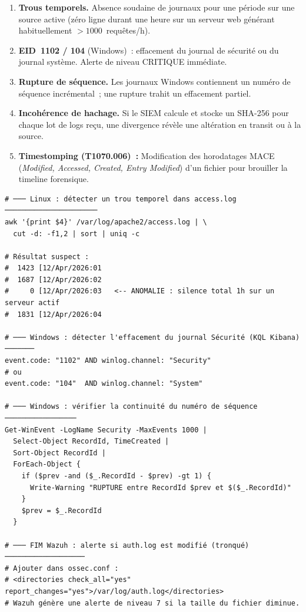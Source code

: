 \begin{enumerate}
  \item \textbf{Trous temporels.} Absence soudaine de journaux pour une
        période sur une source active (zéro ligne durant une heure sur
        un serveur web générant habituellement $>1000$~requêtes/h).
  \item \textbf{EID~1102 / 104} (Windows)~: effacement du journal de
        sécurité ou du journal système. Alerte de niveau CRITIQUE immédiate.
  \item \textbf{Rupture de séquence.} Les journaux Windows contiennent un
        numéro de séquence incrémental~; une rupture trahit un effacement
        partiel.
  \item \textbf{Incohérence de hachage.} Si le SIEM calcule et stocke un
        SHA-256 pour chaque lot de logs reçu, une divergence révèle une
        altération en transit ou à la source.
  \item \textbf{Timestomping (T1070.006)~:} Modification des horodatages
        MACE (\textit{Modified, Accessed, Created, Entry Modified}) d'un
        fichier pour brouiller la timeline forensique.
\end{enumerate}

\begin{lstlisting}[style=StyleTerminal,
  caption={Détection de trous temporels et d'effacement de journaux},
  label={lst:detect-tampering}]
# ─── Linux : détecter un trou temporel dans access.log ──────────────────────
awk '{print $4}' /var/log/apache2/access.log | \
  cut -d: -f1,2 | sort | uniq -c

# Résultat suspect :
#  1423 [12/Apr/2026:01
#  1687 [12/Apr/2026:02
#     0 [12/Apr/2026:03   <-- ANOMALIE : silence total 1h sur un serveur actif
#  1831 [12/Apr/2026:04

# ─── Windows : détecter l'effacement du journal Sécurité (KQL Kibana) ───────
event.code: "1102" AND winlog.channel: "Security"
# ou
event.code: "104"  AND winlog.channel: "System"

# ─── Windows : vérifier la continuité du numéro de séquence ─────────────────
Get-WinEvent -LogName Security -MaxEvents 1000 |
  Select-Object RecordId, TimeCreated |
  Sort-Object RecordId |
  ForEach-Object {
    if ($prev -and ($_.RecordId - $prev) -gt 1) {
      Write-Warning "RUPTURE entre RecordId $prev et $($_.RecordId)"
    }
    $prev = $_.RecordId
  }

# ─── FIM Wazuh : alerte si auth.log est modifié (tronqué) ───────────────────
# Ajouter dans ossec.conf :
# <directories check_all="yes" report_changes="yes">/var/log/auth.log</directories>
# Wazuh génère une alerte de niveau 7 si la taille du fichier diminue.
\end{lstlisting}

